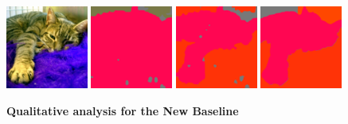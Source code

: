 \begin{figure}[htp]
  {\includegraphics[width=0.24\textwidth]{figures/experiments/context/image/0018.jpg}}
  {\includegraphics[width=0.24\textwidth]{figures/experiments/context/orgckpt/0018.png}}
  {\includegraphics[width=0.24\textwidth]{figures/experiments/context/nonnoisy/0018.png}}
  {\includegraphics[width=0.24\textwidth]{figures/experiments/context/gt/2008_000062.png}}

  \caption[\textbf{Qualitative analysis of the New Baseline}]{\textbf{Qualitative analysis for the New Baseline}}
\end{figure}
